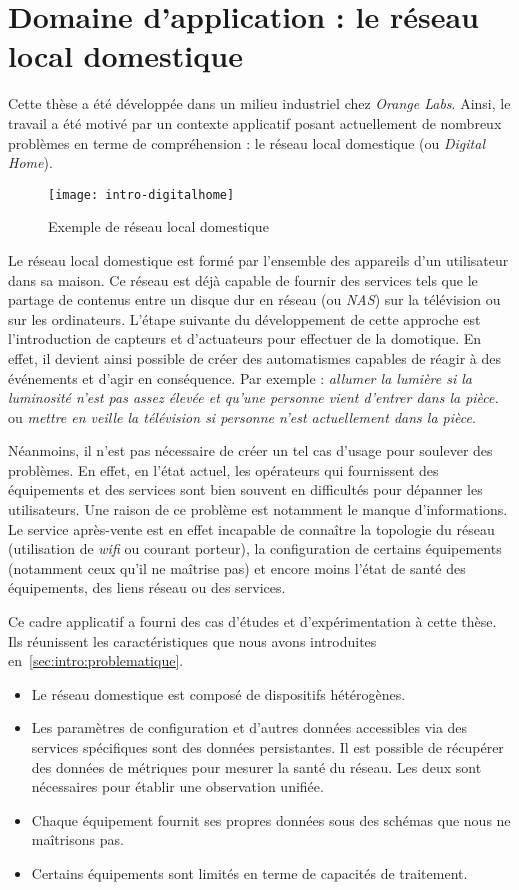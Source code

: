 \section{Domaine d'application : le réseau local domestique}\label{sec:introduction:digitalhome}
Cette thèse a été développée dans un milieu industriel chez \textit{Orange Labs}. Ainsi, le travail a été motivé par un contexte applicatif posant actuellement de nombreux problèmes en terme de compréhension : le réseau local domestique (ou \textit{Digital Home}).

\begin{figure}[ht]
\centering
\texttt{[image: intro-digitalhome]}
\caption{Exemple de réseau local domestique}
\end{figure}

Le réseau local domestique est formé par l'ensemble des appareils d'un utilisateur dans sa maison. Ce réseau est déjà capable de fournir des services tels que le partage de contenus entre un disque dur en réseau (ou \textit{NAS}) sur la télévision ou sur les ordinateurs. L'étape suivante du développement de cette approche est l'introduction de capteurs et d'actuateurs pour effectuer de la domotique. En effet, il devient ainsi possible de créer des automatismes capables de réagir à des événements et d'agir en conséquence. Par exemple : \textit{allumer la lumière si la luminosité n'est pas assez élevée et qu'une personne vient d'entrer dans la pièce.} ou \textit{mettre en veille la télévision si personne n'est actuellement dans la pièce}.

Néanmoins, il n'est pas nécessaire de créer un tel cas d'usage pour soulever des problèmes. En effet, en l'état actuel, les opérateurs qui fournissent des équipements et des services sont bien souvent en difficultés pour dépanner les utilisateurs. Une raison de ce problème est notamment le manque d'informations. Le service après-vente est en effet incapable de connaître la topologie du réseau (utilisation de \textit{wifi} ou courant porteur), la configuration de certains équipements (notamment ceux qu'il ne maîtrise pas) et encore moins l'état de santé des équipements, des liens réseau ou des services.

Ce cadre applicatif a fourni des cas d'études et d'expérimentation à cette thèse. Ils réunissent les caractéristiques que nous avons introduites en~\ref{sec:intro:problematique}.
\begin{itemize}
	\item Le réseau domestique est composé de dispositifs hétérogènes.
	\item Les paramètres de configuration et d'autres données accessibles via des services spécifiques sont des données persistantes. Il est possible de récupérer des données de métriques pour mesurer la santé du réseau. Les deux sont nécessaires pour établir une observation unifiée.
	\item Chaque équipement fournit ses propres données sous des schémas que nous ne maîtrisons pas.
	\item Certains équipements sont limités en terme de capacités de traitement.
\end{itemize}

